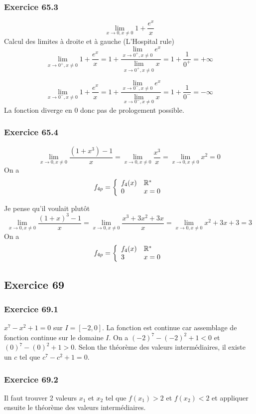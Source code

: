 \documentclass[]{book}
\theoremstyle{definition}
\newcommand{\bb}[1]{\mathbb{#1}}
\newcommand{\R}{\bb{R}}
\begin{document}
\subsubsection*{Exercice 65.3}
$$\lim_{x\to0, x\neq0}1+\frac{e^x}{x}$$
Calcul des limites \`a droite et \`a gauche (L'Hospital rule)
$$\lim_{x\to0^{+}, x\neq0}1+\frac{e^x}{x} = 1+ \frac{\lim_{x\to0^{+}, x\neq0}e^x}{\lim_{x\to0^{+}, x\neq0}x} = 1+ \frac{1}{0^{+}} = +\infty$$

$$\lim_{x\to0^{-}, x\neq0}1+\frac{e^x}{x} = 1+ \frac{\lim_{x\to0^{-}, x\neq0}e^x}{\lim_{x\to0^{-}, x\neq0}x} = 1+ \frac{1}{0^{-}} = -\infty$$
La fonction diverge en 0 donc pas de prologement possible.

\subsubsection*{Exercice 65.4}
$$\lim_{x\to0, x\neq0}\frac{(1+x^3)-1}{x} = \lim_{x\to0, x\neq0}\frac{x^3}{x} = \lim_{x\to0, x\neq0} {x^2} = 0$$
On a 
$$
f_{4p} =
\left\{ 
\begin{array}{l l}
f_4(x) & \R^{*}\\
0 & x =0\\
\end{array}
\right.
$$

Je pense qu'il voulait plut\^ot
$$\lim_{x\to0, x\neq0}\frac{(1+x)^3-1}{x} = \lim_{x\to0, x\neq0}\frac{x^3+3x^2+3x}{x} = \lim_{x\to0, x\neq0} {x^2+3x+3} = 3$$
On a 
$$
f_{4p} =
\left\{ 
\begin{array}{l l}
f_4(x) & \R^{*}\\
3 & x =0\\
\end{array}
\right.
$$



\subsection*{Exercice 69}
\subsubsection*{Exercice 69.1}
$x^7-x^2+1 = 0$ sur $I = [-2,0]$. La fonction est continue car assemblage de fonction continue sur le domaine $I$. On a $(-2)^7 - (-2)^2 + 1 < 0$ et $ (0)^7 - (0)^2 + 1 > 0$. Selon the th\'eor\`eme des valeurs interm\'ediaires, il existe un $c$ tel que $c^7-c^2+1 = 0$.

\subsubsection*{Exercice 69.2}
Il faut trouver 2 valeurs $x_1$ et $x_2$ tel que $f(x_1) > 2$ et $f(x_2) < 2 $ et appliquer ensuite le th\'eor\`eme des valeurs interm\'ediaires.\\
\end{document}
